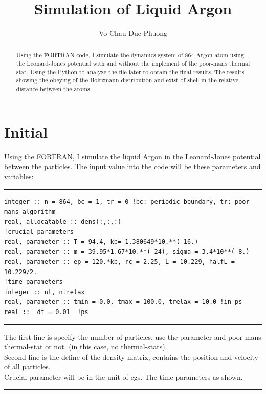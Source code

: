 \documentclass[a4paper]{article}
\author{Vo Chau Duc Phuong}
\title{Simulation of Liquid Argon}
\begin{document}
	\maketitle
\begin{abstract}
Using the FORTRAN code, I simulate the dynamics system of 864 Argon atom using the Leonard-Jones potential with and without the implement of the poor-mans thermal stat. Using the Python to analyze the file later to obtain the final results. The results showing the obeying of the Boltzmann distribution and exist of shell in the relative distance between the atoms
\end{abstract}
\tableofcontents
\section{Initial}
\quad Using the FORTRAN, I simulate the liquid Argon in the Leonard-Jones potential between the particles. The input value into the code will be these parameters and variables:\\
\rule{\textwidth}{1pt}
{\small
 \begin{lstlisting}
integer :: n = 864, bc = 1, tr = 0 !bc: periodic boundary, tr: poor-mans algorithm
real, allocatable :: dens(:,:,:)
!crucial parameters
real, parameter :: T = 94.4, kb= 1.380649*10.**(-16.)
real, parameter :: m = 39.95*1.67*10.**(-24), sigma = 3.4*10**(-8.)
real, parameter :: ep = 120.*kb, rc = 2.25, L = 10.229, halfL = 10.229/2.
!time parameters
integer :: nt, ntrelax
real, parameter :: tmin = 0.0, tmax = 100.0, trelax = 10.0 !in ps
real ::  dt = 0.01  !ps
\end{lstlisting}}
\rule{\textwidth}{1pt}\null\vspace{0.5cm}
\normalsize\null
\quad The first line is specify the number of particles, use the parameter and poor-mans thermal-stat or not. (in this case, no thermal-stats).\\\null
\quad Second line is the define of the density matrix, contains the position and velocity of all particles.\\\null
\quad Crucial parameter will be in the unit of cgs. The time parameters as shown.\\
\rule{\textwidth}{1pt}
\end{document}
